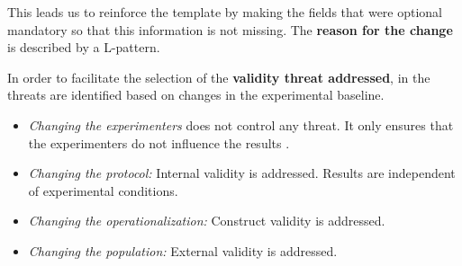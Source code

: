 This leads us to reinforce the template by making the fields that were optional mandatory so that this information is not missing.
The \textbf{reason for the change} is described by a L-pattern.

In order to facilitate the selection of the \textbf{validity threat addressed}, in \cite{gomez2014understanding} the threats are identified based on changes in the experimental baseline.

\begin{itemize}
\item \emph{Changing the experimenters} does not control any threat. It only ensures that the experimenters do not influence the results \cite{Juristo2012}.
\item \emph{Changing the protocol:} Internal validity is addressed. Results are independent of experimental conditions.
\item \emph{Changing the operationalization:} Construct validity is addressed. %
\item \emph{Changing the population:} External validity is addressed. %


    
\end{itemize}

